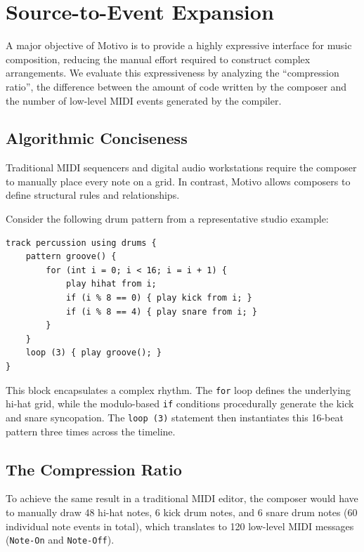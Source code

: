 \section{Source-to-Event Expansion}\label{sec:compression}

A major objective of Motivo is to provide a highly expressive interface for music composition, reducing the
manual effort
required to construct complex arrangements.
We evaluate this expressiveness by analyzing the ``compression ratio'', the difference between the amount of code
written by the composer and the number of low-level MIDI events generated by the compiler.

\subsection{Algorithmic Conciseness}\label{detail-subsec:algorithmic-conciseness}

Traditional MIDI sequencers and digital audio workstations require the composer to manually place every note on a grid.
In contrast, Motivo allows composers to define structural rules and relationships.

Consider the following drum pattern from a representative studio example:
\begin{lstlisting}[language=Motivo, caption={A generative drum pattern using control flow.},label={lst:evaluation-drum-pattern}]
track percussion using drums {
    pattern groove() {
        for (int i = 0; i < 16; i = i + 1) {
            play hihat from i;
            if (i % 8 == 0) { play kick from i; }
            if (i % 8 == 4) { play snare from i; }
        }
    }
    loop (3) { play groove(); }
}
\end{lstlisting}

This block encapsulates a complex rhythm.
The \texttt{for} loop defines the underlying hi-hat grid, while the modulo-based \texttt{if} conditions procedurally
generate the kick and snare syncopation.
The \texttt{loop (3)} statement then instantiates this 16-beat pattern three times across the timeline.

\subsection{The Compression Ratio}\label{detail-subsec:the-compression-ratio}

To achieve the same result in a traditional MIDI editor, the composer would have to manually draw 48 hi-hat notes, 6
kick drum notes, and 6 snare drum notes (60 individual note events in total), which translates to 120 low-level MIDI
messages (\texttt{Note-On} and \texttt{Note-Off}).

